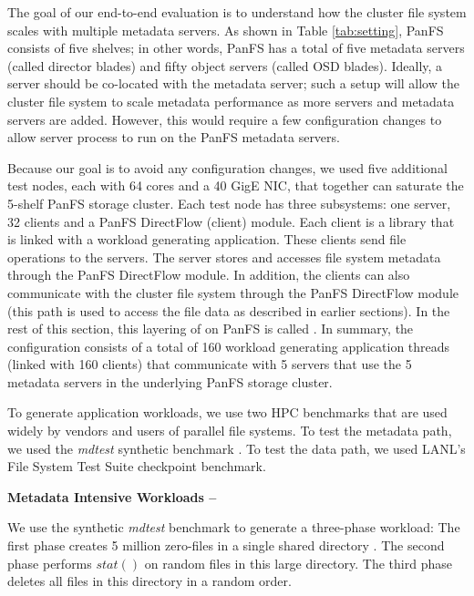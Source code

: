 The goal of our end-to-end evaluation is to understand how the cluster file
system scales with multiple metadata servers.
As shown in Table \ref{tab:setting}, PanFS consists of five shelves; in other
words, PanFS has a total of five metadata servers (called director blades) and
fifty object servers (called OSD blades).
Ideally, a \sys server should be co-located with the metadata server; such a
setup will allow the cluster file system to scale metadata performance as more
\sys servers and metadata servers are added.
However, this would require a few configuration changes to allow \sys server
process to run on the PanFS metadata servers. 

Because our goal is to avoid any configuration changes, we used five additional
test nodes, each with 64 cores and a 40 GigE NIC, that together can saturate 
the 5-shelf PanFS storage cluster.
Each test node has three subsystems: one \sys server, 32 \sys clients and a 
PanFS DirectFlow (client) module.  
Each \sys client is a library that is linked with a workload generating
application. These clients send file operations to the \sys servers. The \sys
server stores and accesses file system metadata through the PanFS DirectFlow
module. In addition, the \sys clients can also communicate with the cluster
file system through the PanFS DirectFlow module (this path is used to access
the file data as described in earlier sections).
In the rest of this section, this layering of \sys on PanFS is called \psys.
In summary, the \psys configuration consists of a total of 160 workload 
generating application threads (linked with 160 \sys clients) that communicate 
with 5 \sys servers that use the 5 metadata servers in the underlying PanFS 
storage cluster. 

To generate application workloads, we use two HPC benchmarks that are used
widely by vendors and users of parallel file systems. 
To test the metadata path, we used the \textit{mdtest} synthetic benchmark 
\cite{mdtest}.
To test the data path, we used LANL's File System Test Suite checkpoint 
benchmark\cite{mpiio}.

\textbf{Metadata Intensive Workloads -- }

We use the synthetic {\it mdtest} benchmark to generate a three-phase workload:
The first phase creates 5 million
zero-files in a single shared directory \cite{ceph:weil06, GIGA11}.
The second phase performs $stat()$ on random files in this large directory.
The third phase deletes all files in this directory in a random order.

